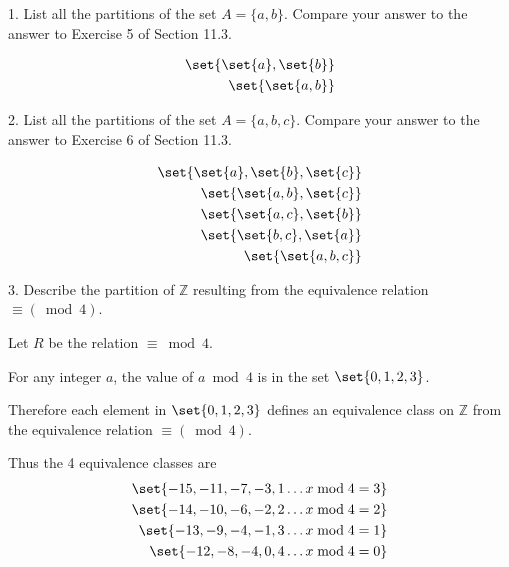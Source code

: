 \documentclass{hippoidC}
\begin{document}
\toc
\thispagestyle{styleTOC}
\pagebreak
\pagestyle{styleE}

\begin{prooflist}{1. List all the partitions of the set $A=\{a, b\}$. Compare your answer to the answer to Exercise 5 of Section 11.3.}
\item
    \begin{align*}
        \set{\set{a}, \set{b}}\\
        \set{\set{a, b}}
    \end{align*}
\end{prooflist}

\begin{prooflist}{2. List all the partitions of the set $A=\{a, b, c\}$. Compare
    your answer to the answer to Exercise 6 of Section 11.3.}
\item
\begin{align*}
    \set{\set{a}, \set{b}, \set{c}}\\
    \set{\set{a, b}, \set{c}}\\
    \set{\set{a, c}, \set{b}}\\
    \set{\set{b, c}, \set{a}}\\
    \set{\set{a, b, c}}
\end{align*}
\end{prooflist}

\begin{prooflist}{3. Describe the partition of $\mathbb{Z}$ resulting from the equivalence relation $\equiv(\bmod 4)$.}
\item Let $R$ be the relation $\equiv\bmod 4$.
\item For any integer $a$, the value of $a\bmod 4$ is in the set $\set{0, 1, 2, 3}$.
\item Therefore each element in $\set{0, 1, 2, 3}$ defines an equivalence class
    on $\mathbb{Z}$ from the equivalence relation $\equiv(\bmod 4)$.
\item Thus the 4 equivalence classes are
\begin{align*}
    \set{-15, -11, -7, -3, 1 \dots x\bmod4=3}\\
    \set{-14, -10, -6, -2, 2 \dots x\bmod4=2}\\
    \set{-13, -9, -4, -1, 3 \dots x\bmod4=1}\\
    \set{-12, -8, -4, 0, 4 \dots x\bmod4=0}\\
\end{align*}

\end{prooflist}
\end{document}
